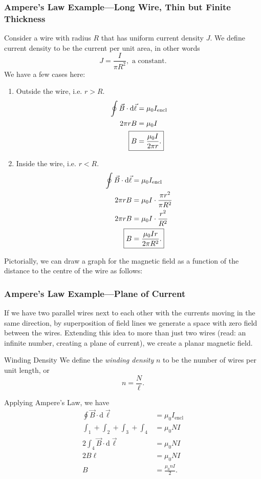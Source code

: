 \documentclass[class=article, crop=false]{standalone}
\begin{document}
  \subsubsection{Ampere's Law Example---Long Wire, Thin but Finite Thickness}
  Consider a wire with radius $R$ that has uniform current density $J$. We define current density to be the current per unit area, in other words
  \[
    J = \frac{I}{\pi R^2}, \text{ a constant}.
  \]
  We have a few cases here:
  \begin{enumerate}[label=(\alph*)]
    \item Outside the wire, i.e. $r > R$.
    \begin{align*}
      \oint \vec{B}\cdot \mathrm{d}\vec{\ell} &= \mu_0I_\text{encl} \\
      2\pi rB &= \mu_0I \\
      \Aboxed{B &= \frac{\mu_0I}{2\pi r}.}
    \end{align*}
    \item Inside the wire, i.e. $r < R$.
    \begin{align*}
      \oint \vec{B}\cdot \mathrm{d}\vec{\ell} &= \mu_0I_\text{encl} \\
      2\pi rB &= \mu_0I\cdot \frac{\pi r^2}{\pi R^2} \\
      2\pi rB &= \mu_0I\cdot \frac{r^2}{R^2} \\
      \Aboxed{B &= \frac{\mu_0Ir}{2\pi R^2}.}
    \end{align*}
  \end{enumerate}
  Pictorially, we can draw a graph for the magnetic field as a function of the distance to the centre of the wire as follows:
  \begin{center}\end{center}
  \subsubsection{Ampere's Law Example---Plane of Current}
  If we have two parallel wires next to each other with the currents moving in the same direction, by superposition of field lines we generate a space with zero field between the wires. Extending this idea to more than just two wires (read: an infinite number, creating a plane of current), we create a planar magnetic field. 
  \begin{center}\end{center}
  \begin{definition}{Winding Density}
    We define the \emph{winding density} $n$ to be the number of wires per unit length, or 
    \[
      n = \frac{N}{\ell}.
    \]
  \end{definition}
  Applying Ampere's Law, we have
  \begin{align*}
    \oint \vec{B}\cdot \mathrm{d}\vec{\ell} &= \mu_0I_\text{encl} \\
    \int_1 + \int_2 + \int_3 + \int_4 &= \mu_0NI\\
    2\int_4 \vec{B}\cdot \mathrm{d}\vec{\ell} &= \mu_0NI\\
    2B\ell &= \mu_0NI \\
    B &= \frac{\mu_0nI}{2}.
  \end{align*}
\end{document}
